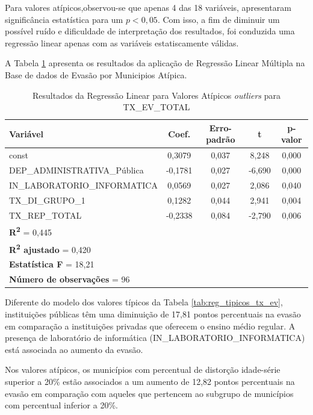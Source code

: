 \documentclass[english, spanish, brazilian]{RBIEarticle} %
\begin{document}
Para valores atípicos,observou-se que apenas 4 das 18 variáveis, apresentaram significância estatística para um $p<0,05$. Com isso, a fim de diminuir um possível ruído e dificuldade de interpretação dos resultados, foi conduzida uma regressão linear apenas com as variáveis estatiscamente válidas.
 
A Tabela \ref{tab:reg_atipicos_tx_ev} apresenta os resultados da aplicação de Regressão Linear Múltipla na Base de dados de Evasão por Municipios Atípica.

\begin{table}[H]
\centering
\caption{Resultados da Regressão Linear para Valores Atípicos
\label{tab:reg_atipicos_tx_ev}
\textit{outliers} para TX\_EV\_TOTAL}
\begin{tabular}{lcccc}
\hline
\textbf{Variável} & \textbf{Coef.} & \textbf{Erro-padrão} & \textbf{t} & \textbf{p-valor} \\
\hline
const & 0,3079 & 0,037 & 8,248 & 0,000 \\
DEP\_ADMINISTRATIVA\_Pública & -0,1781 & 0,027 & -6,690 & 0,000 \\
IN\_LABORATORIO\_INFORMATICA & 0,0569 & 0,027 & 2,086 & 0,040 \\
TX\_DI\_GRUPO\_1 & 0,1282 & 0,044 & 2,941 & 0,004 \\
TX\_REP\_TOTAL & -0,2338 & 0,084 & -2,790 & 0,006 \\
\hline
\multicolumn{5}{l}{\textbf{R\textsuperscript{2}} = 0,445} \\
\multicolumn{5}{l}{\textbf{R\textsuperscript{2} ajustado} = 0,420} \\
\multicolumn{5}{l}{\textbf{Estatística F} = 18,21} \\
\multicolumn{5}{l}{\textbf{Número de observações} = 96} \\
\hline
\end{tabular}
\end{table}


Diferente do modelo dos valores típicos da Tabela \ref{tab:reg_tipicos_tx_ev}, instituições públicas têm uma diminuição de 17,81 pontos percentuais na evasão em comparação a instituições privadas que oferecem o ensino médio regular. 
A presença de laboratório de informática (IN\_LABORATORIO\_INFORMATICA) está associada ao aumento da evasão.

Nos valores atípicos, os municípios com percentual de distorção idade-série superior a 20\% estão associados a um aumento de 12,82 pontos percentuais na evasão em comparação com aqueles que pertencem ao subgrupo de municípios com percentual inferior a 20\%.
\end{document}
